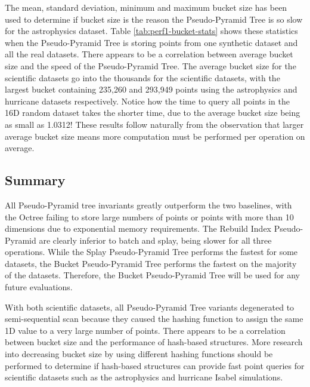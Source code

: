 The mean, standard deviation, minimum and maximum bucket size has been used to determine if bucket size is the reason the Pseudo-Pyramid Tree is so slow for the astrophysics dataset. Table \ref{tab:perf1-bucket-stats} shows these statistics when the Pseudo-Pyramid Tree is storing points from one synthetic dataset and all the real datasets. There appears to be a correlation between average bucket size and the speed of the Pseudo-Pyramid Tree. The average bucket size for the scientific datasets go into the thousands for the scientific datasets, with the largest bucket containing 235,260 and 293,949 points using the astrophysics and hurricane datasets respectively. Notice how the time to query all points in the 16D random dataset takes the shorter time, due to the average bucket size being as small as 1.0312! These results follow naturally from the observation that larger average bucket size means more computation must be performed per operation on average.

\subsection{Summary}

All Pseudo-Pyramid tree invariants greatly outperform the two baselines, with the Octree failing to store large numbers of points or points with more than 10 dimensions due to exponential memory requirements. The Rebuild Index Pseudo-Pyramid are clearly inferior to batch and splay, being slower for all three operations. While the Splay Pseudo-Pyramid Tree performs the fastest for some datasets, the Bucket Pseudo-Pyramid Tree performs the fastest on the majority of the datasets. Therefore, the Bucket Pseudo-Pyramid Tree will be used for any future evaluations.

With both scientific datasets, all Pseudo-Pyramid Tree variants degenerated to semi-sequential scan because they caused the hashing function to assign the same 1D value to a very large number of points. There appears to be a correlation between bucket size and the performance of hash-based structures. More research into decreasing bucket size by using different hashing functions should be performed to determine if hash-based structures can provide fast point queries for scientific datasets such as the astrophysics and hurricane Isabel simulations.
